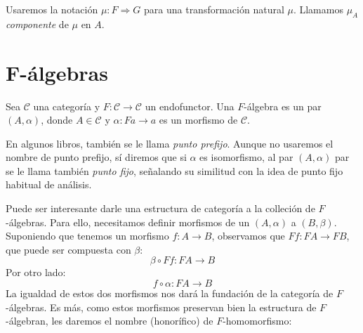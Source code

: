 \documentclass[12pt, twoside]{book}
\newcommand{\cat}{{\mathcal{C}}}
\begin{document}
Usaremos la notación $\mu \colon F \Rightarrow G$ para una transformación natural $\mu$.
Llamamos $\mu_A$ \emph{componente} de $\mu$ en $A$.

\chapter{F-álgebras}
\begin{definition}
Sea $\cat$ una categoría y $F \colon \cat \to \cat$ un endofunctor.
Una $F$-álgebra es un par $(A,\alpha)$, donde $A \in \cat$ y $\alpha \colon F a \to a$ es un morfismo de $\cat$.
\end{definition}

En algunos libros, también se le llama \emph{punto prefijo}.
Aunque no usaremos el nombre de punto prefijo, sí diremos que si $\alpha$ es isomorfismo, al par $(A,\alpha)$ par se le llama también \emph{punto fijo}, señalando su similitud con la idea de punto fijo habitual de análisis.

Puede ser interesante darle una estructura de categoría a la colleción de $F$-álgebras.
Para ello, necesitamos definir morfismos de un $(A,\alpha)$ a $(B,\beta)$.
Suponiendo que tenemos un morfismo $f \colon A \to B$, observamos que $F f \colon F A \to F B$, que puede ser compuesta con $\beta$:
\[ \beta \circ F f \colon F A \to B \]
Por otro lado:
\[ f \circ \alpha \colon F A \to B \]
La igualdad de estos dos morfismos nos dará la fundación de la categoría de $F$-álgebras.
Es más, como estos morfismos preservan bien la estructura de $F$-álgebran, les daremos el nombre (honorífico) de $F$-homomorfismo:
\end{document}

